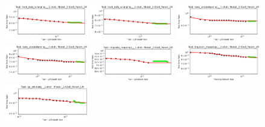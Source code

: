\documentclass{article} %
\begin{document}
\begin{figure}
    \centering

\includegraphics[width=0.325\textwidth]{figures/scaling_laws_benchmark_dataset_plots/__mult_data_wrangling_,__1-shot_____262M.png}
\includegraphics[width=0.325\textwidth]{figures/scaling_laws_benchmark_dataset_plots/__mult_data_wrangling_,__2-shot_____262M.png}
\includegraphics[width=0.325\textwidth]{figures/scaling_laws_benchmark_dataset_plots/__date_understanding_,__1-shot_____262M.png}
\includegraphics[width=0.325\textwidth]{figures/scaling_laws_benchmark_dataset_plots/__date_understanding_,__2-shot_____262M.png}
\includegraphics[width=0.325\textwidth]{figures/scaling_laws_benchmark_dataset_plots/__linguistic_mappings_,__1-shot_____262M.png}
\includegraphics[width=0.325\textwidth]{figures/scaling_laws_benchmark_dataset_plots/__linguistic_mappings_,__2-shot_____262M.png}
\includegraphics[width=0.325\textwidth]{figures/scaling_laws_benchmark_dataset_plots/__qa_wikidata_,__1-shot_____262M.png}

\end{figure}
\end{document}
